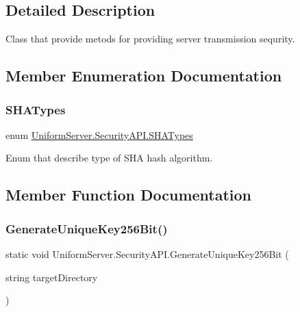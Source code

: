 \subsection{Detailed Description}
Class that provide metods for providing server transmission sequrity. 



\subsection{Member Enumeration Documentation}
\mbox{\label{class_uniform_server_1_1_security_a_p_i_a0013616bf69cff8555e697c0c4960240}} 
\subsubsection{\texorpdfstring{S\+H\+A\+Types}{SHATypes}}
{\footnotesize\ttfamily enum \mbox{\hyperlink{class_uniform_server_1_1_security_a_p_i_a0013616bf69cff8555e697c0c4960240}{Uniform\+Server.\+Security\+A\+P\+I.\+S\+H\+A\+Types}}\hspace{0.3cm}{\ttfamily [strong]}}



Enum that describe type of S\+HA hash algorithm. 



\subsection{Member Function Documentation}
\mbox{\label{class_uniform_server_1_1_security_a_p_i_a47f4dbc862a92f24b030d52b2a79f92b}} 
\subsubsection{\texorpdfstring{Generate\+Unique\+Key256\+Bit()}{GenerateUniqueKey256Bit()}}
{\footnotesize\ttfamily static void Uniform\+Server.\+Security\+A\+P\+I.\+Generate\+Unique\+Key256\+Bit (\begin{DoxyParamCaption}\item[{string}]{target\+Directory }\end{DoxyParamCaption})\hspace{0.3cm}{\ttfamily [static]}}



